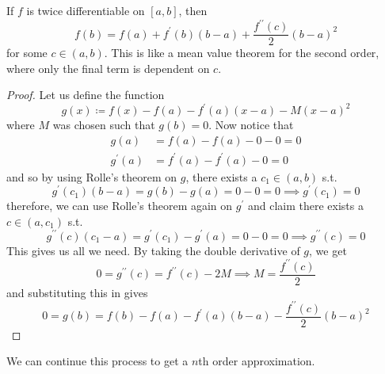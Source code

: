   \begin{theorem}
    If $f$ is twice differentiable on $[a, b]$, then 
    \begin{equation}
      f(b) = f(a) + f^\prime (b) (b - a) + \frac{f^{\prime \prime}(c)}{2} (b-a)^2
    \end{equation}
    for some $c \in (a, b)$. This is like a mean value theorem for the second order, where only the final term is dependent on $c$. 
  \end{theorem} 
  \begin{proof}
    Let us define the function 
    \begin{equation}
      g(x) \coloneqq f(x) - f(a) - f^\prime (a) (x - a) - M (x - a)^2
    \end{equation} 
    where $M$ was chosen such that $g(b) = 0$. Now notice that 
    \begin{align}
      g(a) & = f(a) - f(a) - 0 - 0 = 0 \\ 
      g^\prime (a) & = f^\prime (a) - f^\prime (a) - 0 = 0 
    \end{align}
    and so by using Rolle's theorem on $g$, there exists a $c_1 \in (a, b)$ s.t. 
    \begin{equation}
      g^\prime (c_1) (b - a) = g(b) - g(a) = 0 - 0 = 0 \implies g^\prime (c_1) = 0
    \end{equation}  
    therefore, we can use Rolle's theorem again on $g^\prime$ and claim there exists a $c \in (a, c_1)$ s.t. 
    \begin{equation}
      g^{\prime\prime} (c) (c_1 - a) = g^\prime (c_1) - g^\prime (a) = 0 - 0 = 0 \implies g^{\prime\prime} (c) = 0
    \end{equation}
    This gives us all we need. By taking the double derivative of $g$, we get 
    \begin{equation}
      0 = g^{\prime\prime} (c) = f^{\prime\prime} (c) - 2M \implies M = \frac{f^{\prime\prime} (c)}{2}
    \end{equation}
    and substituting this in gives 
    \begin{equation}
      0 = g(b) = f(b) - f(a) - f^\prime (a) (b - a) - \frac{f^{\prime\prime} (c)}{2} (b - a)^2
    \end{equation}
  \end{proof}

  We can continue this process to get a $n$th order approximation. 

